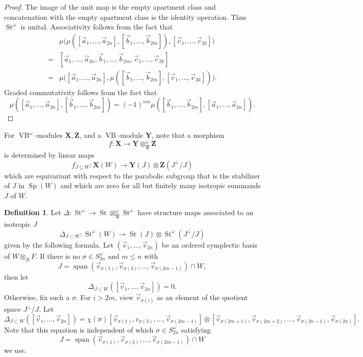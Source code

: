\documentclass[11pt,letterpaper]{amsart}
\DeclareMathOperator{\Span}{span}
\DeclareMathOperator{\VB}{VB}
\DeclareMathOperator{\Sp}{Sp}
\newcommand{\gX}{\mathbf{X}}
\newcommand{\gY}{\mathbf{Y}}
\newcommand{\gZ}{\mathbf{Z}}
\newcommand{\PP}{\mathfrak{P}}
\numberwithin{theoremcounter}{section}
\theoremstyle{definition}
\newtheorem{definition}[Defauto]{Definition}
\theoremstyle{remark}
\DeclareMathOperator{\St}{St}
\begin{document}
\begin{proof} The image of the unit map is the empty apartment class and concatenation with the empty apartment class is the identity operation. Thus $\St^\omega$ is unital.
    Associativity follows from the fact that 
    \begin{align*}
        &\mu\Big(\mu([\vec a_1,\ldots,\vec a_{2n}],[\vec b_1,\ldots,\vec b_{2m}]),[\vec c_1,\ldots,\vec c_{2k}]\Big)\\
        =&[\vec a_1,\ldots,\vec a_{2n},\vec b_1,\ldots,\vec b_{2m},\vec c_1,\ldots,\vec c_{2k}]\\
        =& \mu \Big([\vec a_1,\ldots,\vec a_{2n}],\mu([\vec b_1,\ldots,\vec b_{2m}],[\vec c_1,\ldots,\vec c_{2k}])\Big).
    \end{align*}    
    Graded commutativity follows from the fact that $$\mu([\vec a_1,\ldots,\vec a_{2n}],[\vec b_1,\ldots,\vec b_{2m}])=(-1)^{nm}\mu([\vec b_1,\ldots,\vec b_{2m}],[\vec a_1,\ldots,\vec a_{2n}]).$$
\end{proof}


For $\VB^\omega$-modules $\gX,\gZ$, and a $\VB$-module $\gY$, note that a morphism $$f\colon  \gX \to \gY \otimes_\PP^\omega \gZ  $$ is determined by linear maps $$f_{J \subseteq W}\colon  \gX(W) \to \gY(J) \otimes \gZ(J^\perp /J)$$ which are equivariant with respect to the parabolic subgroup that is the stabilizer of $J$ in $\Sp(W)$ and which are zero for all but finitely many isotropic summands $J$ of $W$.


\begin{definition}
    Let $\Delta\colon  \St^\omega \to \St \otimes_\PP^\omega \St^\omega $ have structure maps associated to an isotropic $J$ $$\Delta_{J \subset W}\colon  \St^\omega(W) \to \St(J) \otimes \St^\omega(J^\perp/J) $$ given by the following formula. Let $(\vec v_1,\dots,\vec v_{2n})$ be an ordered symplectic basis of $W \otimes_R F$. If there is  no  $\sigma \in S_{2n}^\omega$ and $m \leq n$ with $$J=\Span(\vec v_{\sigma(1)},\vec v_{\sigma(3)},\dots,\vec v_{\sigma(2m-1)}) \cap W,$$ then let $$\Delta_{J \subset W} \left([\vec v_1,\dots,\vec v_{2n}]\right) = 0. $$ Otherwise, fix such a $\sigma$.
    For $i > 2m$, view $\vec v_{\sigma(i)}$ as an element of the quotient space $J^\perp/J$. Let 
    $$\Delta_{J \subset W} \left( [\vec v_1,\dots,\vec v_{2n}] \right) = \chi(\sigma)[\vec v_{\sigma(1)},v_{\sigma(3)},\dots, \vec v_{\sigma(2m-1)} ] \otimes [\vec v_{\sigma(2m+1)},\vec v_{\sigma(2m+2)}, \dots, \vec v_{\sigma(2n-1)}, \vec v_{\sigma(2n)} ]. $$    
    Note that this equation is independent of which $\sigma\in S_{2n}^\omega$ satisfying
    $$J=\Span(\vec v_{\sigma(1)},\vec v_{\sigma(3)},\dots,\vec v_{\sigma(2m-1)}) \cap W$$
    we use.
\end{definition}
\end{document}
